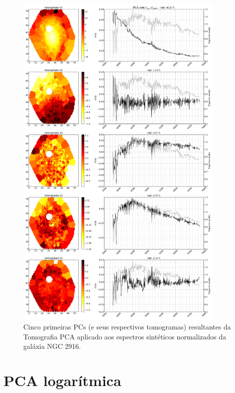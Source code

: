 \begin{figure}
    \includegraphics[width=0.9\textwidth]{figuras/K0277-tomo-syn-norm.pdf}
    \caption[Tomogramas de 1 a 5 da gal\'axia NGC 2916 - $F_{syn} / F_{\lambda 5365}$ .]
    {Cinco primeiras PCs (e seus respectivos tomogramas) resultantes da Tomografia PCA aplicado aos espectros
    sintéticos normalizados da galáxia NGC 2916.}
    \label{fig:PCAaplic:K277tomofsynnorm}
\end{figure}





\section{PCA logarítmica}
\label{sec:PCAaplic:PCAlog}

